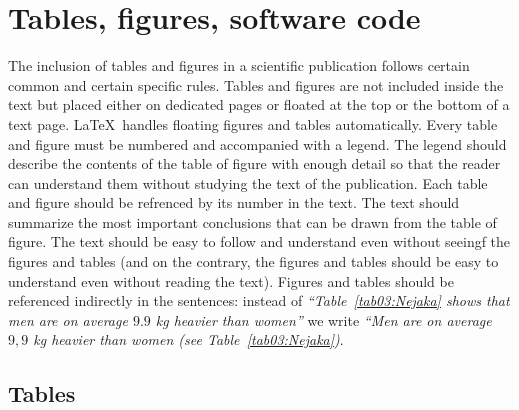 
\chapter{Tables, figures, software code}

The inclusion of tables and figures in a scientific publication follows
certain common and certain specific rules. Tables and figures are not
included inside the text but placed either on dedicated pages or floated
at the top or the bottom of a text page. \LaTeX\ handles floating
figures and tables automatically. Every table and figure must be
numbered and accompanied with a legend. The legend should describe the
contents of the table of figure with enough detail so that the reader
can understand them without studying the text of the publication. Each
table and figure should be refrenced by its number in the text. The
text should summarize the most important conclusions that can be drawn
from the table of figure. The text should be easy to follow and
understand even without seeingf the figures and tables (and on the
contrary, the figures and tables should be easy to understand even
without reading the text). Figures and tables should be referenced
indirectly in the sentences: instead of
\emph{``Table~\ref{tab03:Nejaka} shows that men are on average $9.9$
  kg heavier than women''} we write \emph{``Men are on average $9,9$
  kg heavier than women (see Table~\ref{tab03:Nejaka})}.


\section{Tables}

